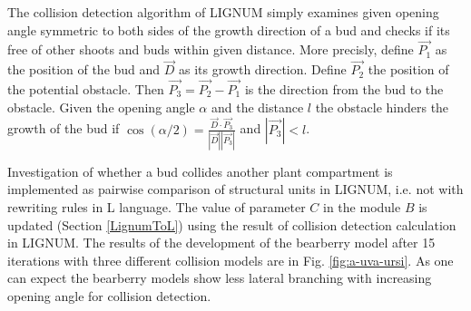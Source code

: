 The  collision detection  algorithm  of LIGNUM  simply examines  given
opening angle symmetric to both sides of the growth direction of a bud
and checks if its free of other shoots and buds within given distance.
More  precisly, define $\vec  {P_1}$ as  the position  of the  bud and
$\vec D$ as its growth  direction. Define $\vec {P_2}$ the position of
the potential obstacle. Then $\vec {P_3} = \vec {P_2} - \vec {P_1}$ is
the direction from  the bud to the obstacle.   Given the opening angle
$\alpha$ and the  distance $l$ the obstacle hinders  the growth of the
bud  if $\cos(\alpha/2) =  \frac{{\vec D}  \cdot {\vec  {P_3}}} {|\vec
D||\vec {P_3}|}$ and $|\vec {P_3}| < l$.

Investigation of  whether a bud collides another  plant compartment is
implemented as pairwise comparison of structural units in LIGNUM, i.e.
not with rewriting rules in L language.  The value of parameter $C$ in
the module  $B$ is updated (Section \ref{LignumToL})  using the result
of  collision detection  calculation in  LIGNUM.  The  results  of the
development  of the  bearberry model  after 15  iterations  with three
different collision models are  in Fig.  \ref{fig:a-uva-ursi}.  As one
can  expect the  bearberry  models show  less  lateral branching  with
increasing opening angle for collision detection.
 

















